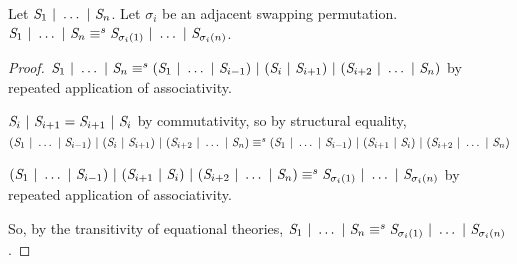 \documentclass[acmsmall]{acmart}
\begin{document}
\begin{lemma}
  \label{lem:adj-swap-or}
  Let $\mathit{S}_1 ~|~ \ldots ~|~ \mathit{S}_n$.  Let $\sigma_i$ be an adjacent
  swapping permutation.  $\mathit{S}_1 ~|~ \ldots ~|~ \mathit{S}_n \equiv^s
  \mathit{S}_{\sigma_i(1)} ~|~ \ldots ~|~ \mathit{S}_{\sigma_i(n)}$.
\end{lemma}
\begin{proof}
  $\mathit{S}_1 ~|~ \ldots ~|~ \mathit{S}_n \equiv^s (\mathit{S}_1 ~|~ \ldots ~|~
  \mathit{S}_{i-1}) ~|~ (\mathit{S}_{i} ~|~ \mathit{S}_{i+1}) ~|~ (\mathit{S}_{i+2} ~|~ \ldots
  ~|~ \mathit{S}_n)$ by repeated application of associativity.
  
  $\mathit{S}_i ~|~ \mathit{S}_{i+1} = \mathit{S}_{i+1} ~|~ \mathit{S}_{i}$ by \OrRegexType
  commutativity, so by \OrRegexType{} structural equality,
  $(\mathit{S}_1 ~|~ \ldots ~|~
  \mathit{S}_{i-1}) ~|~ (\mathit{S}_{i} ~|~ \mathit{S}_{i+1}) ~|~ (\mathit{S}_{i+2} ~|~ \ldots
  ~|~ \mathit{S}_n) \equiv^s
  (\mathit{S}_1 ~|~ \ldots ~|~
  \mathit{S}_{i-1}) ~|~ (\mathit{S}_{i+1} ~|~ \mathit{S}_{i}) ~|~ (\mathit{S}_{i+2} ~|~ \ldots
  ~|~ \mathit{S}_n)$
  
  $(\mathit{S}_1 ~|~ \ldots ~|~
  \mathit{S}_{i-1}) ~|~ (\mathit{S}_{i+1} ~|~ \mathit{S}_{i}) ~|~ (\mathit{S}_{i+2} ~|~ \ldots
  ~|~ \mathit{S}_n) \equiv^s
  \mathit{S}_{\sigma_i(1)} ~|~ \ldots ~|~ \mathit{S}_{\sigma_i(n)}$ by repeated
  application of associativity.
  
  So, by the transitivity of equational theories,
  $\mathit{S}_1 ~|~ \ldots ~|~ \mathit{S}_n \equiv^s
  \mathit{S}_{\sigma_i(1)} ~|~ \ldots ~|~ \mathit{S}_{\sigma_i(n)}$.
\end{proof}
\end{document}
